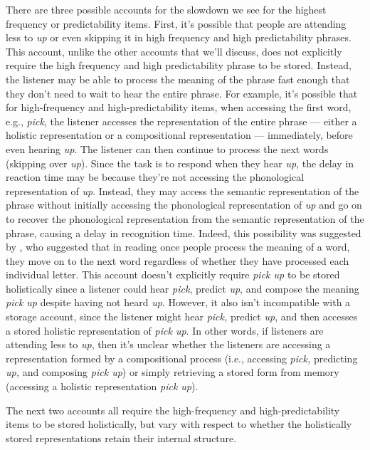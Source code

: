 \documentclass[
  authoryear,
  preprint,
  1p,
  onecolumn]{elsarticle}
\begin{document}
There are three possible accounts for the slowdown we see for the
highest frequency or predictability items. First, it's possible that
people are attending less to \emph{up} or even skipping it in high
frequency and high predictability phrases. This account, unlike the
other accounts that we'll discuss, does not explicitly require the high
frequency and high predictability phrase to be stored. Instead, the
listener may be able to process the meaning of the phrase fast enough
that they don't need to wait to hear the entire phrase. For example,
it's possible that for high-frequency and high-predictability items,
when accessing the first word, e.g., \emph{pick}, the listener accesses
the representation of the entire phrase --- either a holistic
representation or a compositional representation --- immediately, before
even hearing \emph{up}. The listener can then continue to process the
next words (skipping over \emph{up}). Since the task is to respond when
they hear \emph{up}, the delay in reaction time may be because they're
not accessing the phonological representation of \emph{up}. Instead,
they may access the semantic representation of the phrase without
initially accessing the phonological representation of \emph{up} and go
on to recover the phonological representation from the semantic
representation of the phrase, causing a delay in recognition time.
Indeed, this possibility was suggested by \citet{healy1976}, who
suggested that in reading once people process the meaning of a word,
they move on to the next word regardless of whether they have processed
each individual letter. This account doesn't explicitly require
\emph{pick up} to be stored holistically since a listener could hear
\emph{pick}, predict \emph{up}, and compose the meaning \emph{pick up}
despite having not heard \emph{up}. However, it also isn't incompatible
with a storage account, since the listener might hear \emph{pick,}
predict \emph{up}, and then accesses a stored holistic representation of
\emph{pick up}. In other words, if listeners are attending less to
\emph{up}, then it's unclear whether the listeners are accessing a
representation formed by a compositional process (i.e., accessing
\emph{pick,} predicting \emph{up,} and composing \emph{pick up}) or
simply retrieving a stored form from memory (accessing a holistic
representation \emph{pick up}).

The next two accounts all require the high-frequency and
high-predictability items to be stored holistically, but vary with
respect to whether the holistically stored representations retain their
internal structure.
\end{document}
